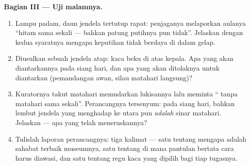 \begin{problem}
\medskip\noindent\textbf{Bagian III --- Uji malamnya.}
\begin{enumerate}[resume]
  \item Lampu padam, daun jendela tertutup rapat: penjaganya
        melaporkan aulanya ``hitam sama sekali --- bahkan patung
        putihnya pun tidak''. Jelaskan dengan kedua syaratnya mengapa
        keputihan tidak berdaya di dalam gelap.
  \item Diusulkan sebuah jendela atap: kaca beku di atas kepala. Apa
        yang akan diantarkannya pada siang hari, dan apa yang akan
        ditolaknya untuk diantarkan (pemandangan awan, silau matahari
        langsung)?
  \item Kuratornya takut  matahari memudarkan lukisannya lalu
        meminta `` tanpa matahari sama sekali''. Perancangnya
        tersenyum: pada siang hari, bahkan  lembut jendela yang
        menghadap ke utara pun \emph{adalah} sinar matahari. Jelaskan
        --- apa yang telah meneruskannya?
  \item Tulislah laporan perancangnya: tiga kalimat --- satu tentang
        mengapa  adalah sahabat terbaik museumnya, satu
        tentang di mana pantulan bertata cara  harus diawasi,
        dan satu tentang regu kaca yang dipilih bagi tiap tugasnya.
\end{enumerate}
\end{problem}
